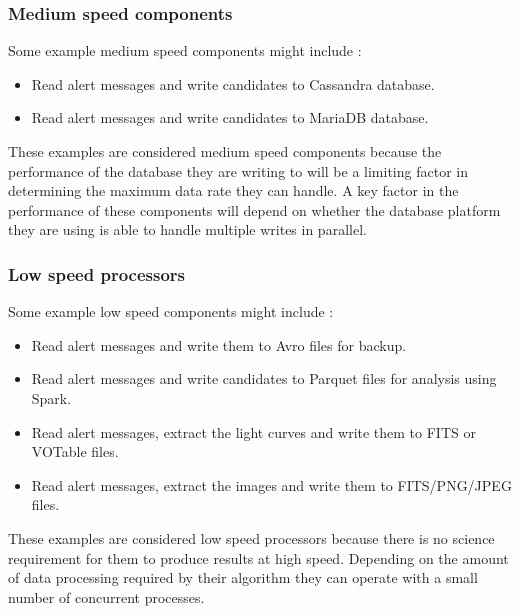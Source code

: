 \documentclass{article}
\newcommand{\avro} {Avro\xspace}
\newcommand{\fits} {FITS\xspace}
\newcommand{\parquet} {Parquet\xspace}
\newcommand{\votable} {VOTable\xspace}
\newcommand{\spark} {Spark\xspace}
\newcommand{\cassandra} {Cassandra\xspace}
\newcommand{\mariadb} {MariaDB\xspace}
\newcommand{\phasea} {phase A\xspace}
\newcommand{\lsstuk} {LSST:UK\xspace}
\begin{document}
\subsubsection{Medium speed components}
\label{stage-2.medium-speed.components}

Some example medium speed components might include :
\begin{itemize}
  \item Read alert messages and write candidates to \cassandra database.
  \item Read alert messages and write candidates to \mariadb database.
\end{itemize}

These examples are considered medium speed components because the performance of the database they are writing to will be a limiting factor in determining the maximum data rate they can handle. A key factor in the performance of these components will depend on whether the database platform they are using is able to handle multiple writes in parallel.


\subsubsection{Low speed processors}
\label{stage-2.low-speed.processors}

Some example low speed components might include :
\begin{itemize}
  \item Read alert messages and write them to \avro files for backup.
  \item Read alert messages and write candidates to \parquet files for analysis using \spark.
  \item Read alert messages, extract the light curves and write them to \fits or \votable files.
  \item Read alert messages, extract the images and write them to FITS/PNG/JPEG files.
\end{itemize}

These examples are considered low speed processors because there is no science requirement for them to produce results at high speed. Depending on the amount of data processing required by their algorithm they can operate with a small number of concurrent processes.
\end{document}
